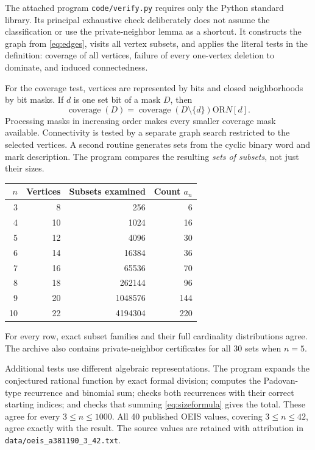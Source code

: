 \documentclass[11pt,letterpaper]{article}
\numberwithin{equation}{section}
\theoremstyle{definition}
\theoremstyle{remark}
\begin{document}
The attached program \texttt{code/verify.py} requires only the Python
standard library. Its principal exhaustive check deliberately does
not assume the classification or use the private-neighbor lemma
as a shortcut. It constructs the graph from \eqref{eq:edges}, visits
all vertex subsets, and applies the literal tests in the definition:
coverage of all vertices, failure of every one-vertex deletion to
dominate, and induced connectedness.

For the coverage test, vertices are represented by bits and closed
neighborhoods by bit masks. If $d$ is one set bit of a mask $D$, then
\[
 \operatorname{coverage}(D)=
 \operatorname{coverage}(D\setminus\{d\})\mathbin{\mathrm{OR}}N[d].
\]
Processing masks in increasing order makes every smaller coverage
mask available. Connectivity is tested by a separate graph search
restricted to the selected vertices. A second routine generates
sets from the cyclic binary word and mark description. The program
compares the resulting \emph{sets of subsets}, not just their sizes.

\begin{center}
\begin{tabular}{r r r r}
\toprule
$n$ & Vertices & Subsets examined & Count $a_n$\\
\midrule
3 & 8 & 256 & 6\\
4 & 10 & 1024 & 16\\
5 & 12 & 4096 & 30\\
6 & 14 & 16384 & 36\\
7 & 16 & 65536 & 70\\
8 & 18 & 262144 & 96\\
9 & 20 & 1048576 & 144\\
10 & 22 & 4194304 & 220\\
\bottomrule
\end{tabular}
\end{center}
For every row, exact subset families and their full cardinality
distributions agree. The archive also contains private-neighbor
certificates for all 30 sets when $n=5$.

Additional tests use different algebraic representations. The
program expands the conjectured rational function by exact formal
division; computes the Padovan-type recurrence and binomial sum;
checks both recurrences with their correct starting indices; and
checks that summing \eqref{eq:sizeformula} gives the total. These
agree for every $3\le n\le1000$. All 40 published OEIS values,
covering $3\le n\le42$, agree exactly with the result. The source
values are retained with attribution in
\texttt{data/oeis\_a381190\_3\_42.txt}.
\end{document}
